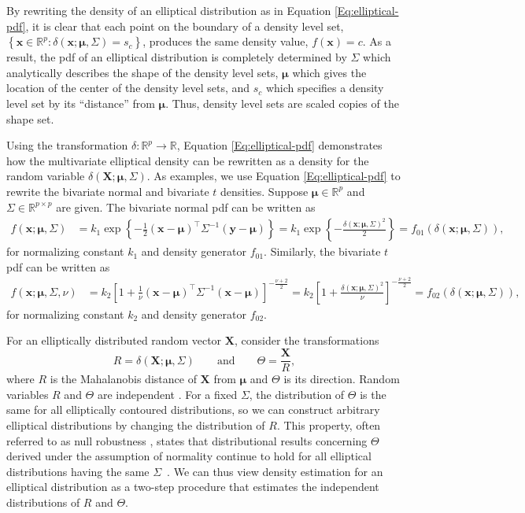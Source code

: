 \documentclass[]{article}
\newcommand{\eqq}[2][]{\begin{equation*} #2 \end{equation*}}
\numberwithin{equation}{section}
\newcommand{\brac}[1]{\left[ #1 \right]} %
\newcommand{\de}{\delta} %
\newcommand{\expo}[1]{\exp\set{#1}} %
\newcommand{\fnc}[2]{#1\!\paren{#2}} %
\newcommand{\mub}{\bm{{\mu}}} %
\newcommand{\paren}[1]{\left( #1 \right)} %
\newcommand{\R}{\mathbb{R}} %
\newcommand{\set}[1]{\left\{ #1 \right\}} %
\renewcommand{\T}{\Theta} %
\newcommand{\tr}{^{\intercal}}
\newcommand{\vecl}[1]{\mathbf{#1}}
\newcommand{\Xb}{\vecl{X}}
\newcommand{\xb}{\mathbf{x}}
\newcommand{\yb}{\vecl{y}}
\begin{document}
By rewriting the density of an elliptical distribution as in Equation \nolinebreak\eqref{Eq:elliptical-pdf}, it is clear that each point on the boundary of a density level set, \(\set{\xb \in \R^p : \fnc{\de}{\xb; \mub, \Sigma} = s_c}\), produces the same density value, \(\fnc{f}{\xb} = c\). As a result, the \ac{pdf} of an elliptical distribution is completely determined by \(\Sigma\) which analytically describes the shape of the density level sets, \(\mub\) which gives the location of the center of the density level sets, and \(s_c\) which specifies a density level set by its ``distance'' from \(\mub\). Thus, density level sets are scaled copies of the shape set.

Using the transformation \(\de:\R^p\to\R\), Equation \eqref{Eq:elliptical-pdf} demonstrates how the multivariate elliptical density can be rewritten as a density for the random variable \(\fnc{\de}{\Xb; \mub, \Sigma}\). As examples, we use Equation \eqref{Eq:elliptical-pdf} to rewrite the bivariate normal and bivariate \(t\) densities. Suppose \(\mub \in \R^p\) and \(\Sigma \in \R^{p\times p}\) are given. The bivariate normal \ac{pdf} can be written as \begin{align*}
  \fnc{f}{\xb; \mub, \Sigma} &= k_1\expo{-\frac{1}{2}\paren{\xb - \mub}\tr\Sigma^{-1}\paren{\yb - \mub}}
    = k_1\expo{-\frac{\fnc{\de}{\xb; \mub, \Sigma}^2}{2}} 
    = \fnc{f_{01}}{\fnc{\de}{\xb; \mub, \Sigma}},
  \end{align*}
for normalizing constant \(k_1\) and density generator \(f_{01}\). Similarly, the bivariate \(t\) \ac{pdf} can be written as \begin{align*}
  \fnc{f}{\xb; \mub, \Sigma, \nu} &= k_2\brac{1 + \frac{1}{\nu}\paren{\xb - \mub}\tr\Sigma^{-1}\paren{\xb - \mub}}^{-\frac{\nu + 2}{2}}
    = k_2\brac{1 + \frac{\fnc{\de}{\xb; \mub, \Sigma}^2}{\nu}}^{-\frac{\nu + 2}{2}} 
    = \fnc{f_{02}}{\fnc{\de}{\xb; \mub, \Sigma}},
  \end{align*}
for normalizing constant \(k_2\) and density generator \(f_{02}\).

For an elliptically distributed random vector \(\Xb\), consider the transformations \eqq{
  R = \fnc{\de}{\Xb; \mub, \Sigma} \qquad \text{and} \qquad \T = \frac{\Xb}{R},
} where \(R\) is the Mahalanobis distance of \(\Xb\) from \(\mub\) and \(\T\) is its direction. Random variables \(R\) and \(\T\) are independent \mbox{\citep{Kamiya2008}}. For a fixed \(\Sigma\), the distribution of \(\T\) is the same for all elliptically contoured distributions, so we can construct arbitrary elliptical distributions by changing the distribution of \(R\). This property, often referred to as null robustness \citep{Kariya1989}, states that distributional results concerning \(\T\) derived under the assumption of normality continue to hold for all elliptical distributions having the same \mbox{$\Sigma$ \citep{Kamiya2008}}. We can thus view density estimation for an elliptical distribution as a two-step procedure that estimates the independent distributions of \(R\) and \(\T\).
\end{document}
